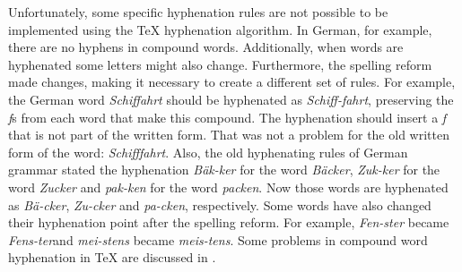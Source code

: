 \documentclass{article}
\begin{document}
Unfortunately, some specific hyphenation rules are not possible to be
implemented using the \TeX{} hyphenation algorithm. In German, for example,
there are no hyphens in compound words. Additionally, when words are hyphenated
some letters might also change. Furthermore, the spelling reform made changes,
making it necessary to create a different set of rules. For example, the German
word \emph{Schiffahrt} should be hyphenated as \emph{Schiff-fahrt}, preserving
the \emph{f}s from each word that make this compound. The hyphenation should
insert a \emph{f} that is not part of the written form. That was not a problem
for the old written form of the word: \emph{Schifffahrt}. Also, the old
hyphenating rules of German grammar stated the hyphenation \emph{Bäk-ker} for
the word \emph{Bäcker}, \emph{Zuk-ker} for the word \emph{Zucker} and
\emph{pak-ken} for the word \emph{packen}. Now those words are hyphenated as
\emph{Bä-cker}, \emph{Zu-cker} and \emph{pa-cken}, respectively. Some words
have also changed their hyphenation point after the spelling reform. For
example, \emph{Fen-ster} became \emph{Fens-ter}and \emph{mei-stens} became
\emph{meis-tens}. Some problems in compound word hyphenation in \TeX{} are
discussed in \cite{sojka1995a}.







\end{document}
